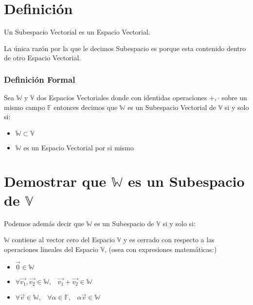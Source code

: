 \documentclass[12pt]{report}                                    %
\DeclareMathOperator \Space {\quad}                             %
\DeclareMathOperator \MiniSpace {\;}                            %
\begin{document}
        \clearpage
        \section{Definición}

            Un Subespacio Vectorial es un Espacio Vectorial.

            La única razón por la que le decimos Subespacio es porque esta contenido dentro de
            otro Espacio Vectorial.

            \subsubsection*{Definición Formal}
                Sea $\mathbb{W}$ y $\mathbb{V}$ dos Espacios Vectoriales donde con identidas
                operaciones $+, \cdot$ sobre un mismo campo $\mathbb{F}$ entonces decimos
                que $\mathbb{W}$ es un Subespacio Vectorial de $\mathbb{V}$ si y solo si:

                \begin{itemize}
                    \item $\mathbb{W} \subset \mathbb{V}$
                    \item $\mathbb{W}$ es un Espacio Vectorial por si mismo
                \end{itemize}


        \section{Demostrar que $\mathbb{W}$ es un Subespacio de $\mathbb{V}$}

            Podemos además decir que $\mathbb{W}$ es un Subespacio de $\mathbb{V}$
            si y solo si:

            $\mathbb{W}$ contiene al vector cero del Espacio $\mathbb{V}$ y es cerrado
            con respecto a las operaciones lineales del Espacio $\mathbb{V}$, (osea con
            expresiones matemáticas:)

            \begin{itemize}
                \item $\vec{0} \in \mathbb{W}$
                
                \item $\forall \vec{v_1}, \vec{v_2} \in \mathbb{W}, \MiniSpace
                            \vec{v_1} + \vec{v_2} \in \mathbb{W}$

                \item $\forall \vec{v} \in \mathbb{W}, \MiniSpace
                            \forall \alpha \in \mathbb{F}, \MiniSpace
                                \alpha \vec{v} \in \mathbb{W}$
             \end{itemize}
\end{document}
